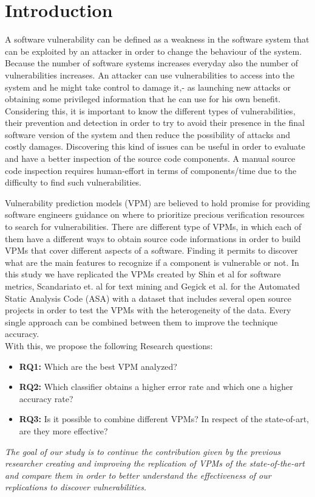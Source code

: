 \documentclass[twocolumn,10pt]{asme2ej}
\begin{document}
\section{Introduction}

A software vulnerability can be defined as a weakness in the software system that can be exploited by an attacker in order to change the behaviour of the system. Because the number of software systems increases everyday also the number of vulnerabilities increases.
An attacker can use vulnerabilities to access into the system and he might take control to damage it,- as launching new attacks or obtaining some privileged information that he can use for his own benefit. Considering this, it is important to know the different types of vulnerabilities, their prevention and detection in order to try to avoid their presence in the final software version of the system and then reduce the possibility of attacks and costly damages.
Discovering this kind of issues can be useful in order to evaluate and have a better inspection of the source code components.
A manual source code inspection requires human-effort in terms of components/time due to the difficulty to find such vulnerabilities.

Vulnerability prediction models (VPM) are believed to hold promise for providing software engineers guidance on where to prioritize precious verification resources to search for vulnerabilities.
There are different type of VPMs, in which each of them have a different ways to obtain source code informations in order to build VPMs that cover different aspects of a software. Finding it permits to discover what are the main features to recognize if a component is vulnerable or not.
In this study we have replicated the VPMs created by Shin et al \cite{Shin} for software metrics, Scandariato et. al \cite{Scandariato} for text mining and Gegick et al. \cite{Gegick} for the Automated Static Analysis Code (ASA) with a dataset that includes several open source projects in order to test the VPMs with the heterogeneity of the data.
Every single approach can be combined between them to improve the technique accuracy.\\
With this, we propose the following Research questions:
\begin{itemize}
    \item \textbullet \textbf{RQ1:} Which are the best VPM analyzed?
    \item \textbullet \textbf{RQ2:} Which classifier obtains a higher error rate and which one a higher accuracy rate?
    \item \textbullet \textbf{RQ3:} Is it possible to combine different VPMs? In respect of the state-of-art, are they more effective?
\end{itemize}
\textit{The goal of our study is to continue the contribution given by the previous researcher creating and improving the replication of VPMs of the state-of-the-art and compare them in order to better understand the effectiveness of our replications to discover vulnerabilities.}
\end{document}
